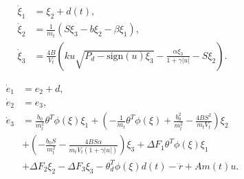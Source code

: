 \documentclass[10pt,a4paper]{amsart}
\begin{document}
 \begin{equation} \label{MyEq4}
  \begin{split}
  {\dot \xi}_1 &= \xi_2+d(t),\\
  {\dot \xi}_2 &= \tfrac{1}{m_t}(S \xi_3-b\xi_2-\beta \xi_1),\\
  {\dot \xi}_3 &= \tfrac{4B}{V_t}(ku\sqrt{P_d-\text{sign}(u)\xi_3}-\tfrac{\alpha \xi_3}{1+\gamma \lvert u\rvert}-S\xi_2 ).
  \end{split}
\end{equation}

\begin{equation} \label{MyEq87a}
  \begin{split}
  {\dot e_1} &= e_2 + d,\\
  {\dot e_2} &= e_3,\\
  {\dot e_3} &= \tfrac{b_0}{m_t^2}\theta^T\phi(\xi)\xi_1 +(-\tfrac{1}{m_t}\theta^T\phi(\xi)+\tfrac{b_0^2}{m_t^2}-\tfrac{4BS^2}{m_tV_t})\xi_2\\
  &+(-\tfrac{b_0S}{m_t^2}-\tfrac{4BS\alpha}{m_tV_t(1+\gamma \lvert u \rvert)})\xi_3 + \Delta F_1\theta^T\phi(\xi)\xi_1\\
  & +\Delta F_2\xi_2-\Delta F_3\xi_3-\theta_d^T\phi(\xi)d(t)-{\dddot r} + Am(t)u.
  \end{split}
\end{equation}
\end{document}
